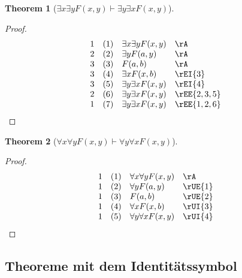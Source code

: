 \documentclass{book}
\theoremstyle{plain}
\newtheorem{theorem}{Theorem}
\theoremstyle{remark}
\theoremstyle{definition}
\begin{document}
\label{ExxExyFLpxwyRpImpExyExxFLpxwyRp}
\begin{theorem}[\(\exists x\exists yF(x,y)\vdash \exists y\exists x F(x,y)\)]
\end{theorem}
\begin{proof}
	\[
	\begin{array}{llll}
		1 & (1) & \exists x\exists y F(x,y) & \rA \\
		2 & (2) & \exists y F(a,y) & \rA \\
		3 & (3) & F(a,b) & \rA \\
		3 & (4) & \exists xF(x,b) & \rEI{3} \\
		3 & (5) & \exists y\exists xF(x,y) & \rEI{4} \\
		2 & (6) & \exists y\exists xF(x,y) & \rEE{2,3,5} \\
		1 & (7) & \exists y\exists xF(x,y) & \rEE{1,2,6} \\
	\end{array}
	\]
\end{proof}

\begin{theorem}[\(\forall x\forall yF(x,y)\vdash \forall y\forall x F(x,y)\)]
\end{theorem}
\begin{proof}
	\[
	\begin{array}{llll}
		1 & (1) & \forall x\forall y F(x,y) & \rA \\
		1 & (2) & \forall y F(a,y) & \rUE{1}\\
		1 & (3) & F(a,b) & \rUE{2}\\
		1 & (4) & \forall x F(x,b) & \rUI{3}\\
		1 & (5) & \forall y\forall x F(x,y) & \rUI{4}\\
	\end{array}
	\]
\end{proof}


\subsection{Theoreme mit dem Identitätssymbol}
\end{document}
